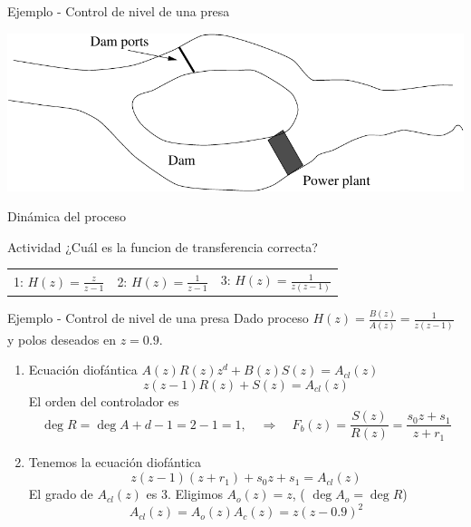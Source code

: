\documentclass[presentation,aspectratio=169]{beamer}
\begin{document}
\begin{frame}[label={sec:org5ae7701}]{Ejemplo - Control de nivel de una presa}
\begin{center}
\includegraphics[width=0.5\linewidth]{../../figures/kraftverk}
\end{center}

\alert{Dinámica del proceso}

\begin{center}
\end{center}

\alert{Actividad} ¿Cuál es la funcion de transferencia correcta?

\begin{center}
\begin{tabular}{lll}
1: \(H(z) = \frac{z}{z-1}\) & 2: \(H(z)=\frac{1}{z-1}\) & 3: \(H(z)=\frac{1}{z(z-1)}\)\\
\end{tabular}
\end{center}
\end{frame}

\begin{frame}[label={sec:org3a2edc4}]{Ejemplo - Control de nivel de una presa}
Dado proceso \(H(z) = \frac{B(z)}{A(z)} = \frac{1}{z(z-1)}\) y polos deseados en \(z=0.9\).

\begin{enumerate}
\item Ecuación diofántica \(A(z)R(z)z^d + B(z)S(z) = A_{cl}(z)\)
\[ z(z-1)R(z) + S(z) = A_{cl}(z)\]
El orden del controlador es 
\[\deg R = \deg A + d - 1 = 2-1 = 1, \quad \Rightarrow \quad F_b(z)=\frac{S(z)}{R(z)} = \frac{s_0z + s_1}{z + r_1}\]
\item Tenemos la ecuación diofántica
\[ z(z-1)(z+r_1) + s_0z + s_1 = A_{cl}(z)\]
El grado de \(A_{cl}(z)\) es 3. Eligimos \(A_o(z) = z\),  ( \(\deg A_o = \deg R\)) 
\[ A_{cl}(z) = A_o(z) A_c(z) = z(z-0.9)^2\]
\end{enumerate}
\end{frame}
\end{document}
